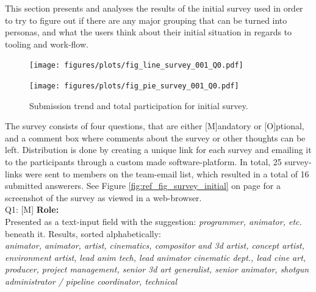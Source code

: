   This section presents and analyses the results of the initial survey used in
  order to try to figure out if there are any major grouping that can be turned
  into personas, and what the users think about their initial situation in
  regards to tooling and work-flow.

  \begin{figure}[H]
    \centering
    \begin{minipage}[b]{0.44\textwidth}
        \centering
          \texttt{[image: figures/plots/fig\_line\_survey\_001\_Q0.pdf]}
    \end{minipage}
    \begin{minipage}[b]{0.49\textwidth}
        \texttt{[image: figures/plots/fig\_pie\_survey\_001\_Q0.pdf]}
    \end{minipage}
    \caption{Submission trend and total participation for initial survey.}
  \end{figure}


  \vspace{0.2cm}
  The survey consists of four questions, that are either [M]andatory or
  [O]ptional, and a comment box where comments about the survey or other
  thoughts can be left. Distribution is done by creating a unique link for each
  survey and emailing it to the participants through a custom made software-platform. In
  total, 25 survey-links were sent to members on the team-email list, which
  resulted in a total of 16
  submitted answerers. See Figure \ref{fig:ref_fig_survey_initial} on page
  \pageref{fig:ref_fig_survey_initial} for a screenshot of
  the survey as viewed in a web-browser.\\

  Q1: [M] \textbf{Role:} \\ Presented as a text-input field with the suggestion: \textit{programmer,
    animator, etc.} beneath it. Results, sorted alphabetically:  \\
  \textit{
    animator, animator, artist, cinematics, compositor and 3d artist, concept
    artist, environment artist, lead anim tech, lead animator cinematic dept., lead
    cine art, producer, project management, senior 3d art generalist, senior
    animator, shotgun administrator / pipeline coordinator, technical
  } \\

